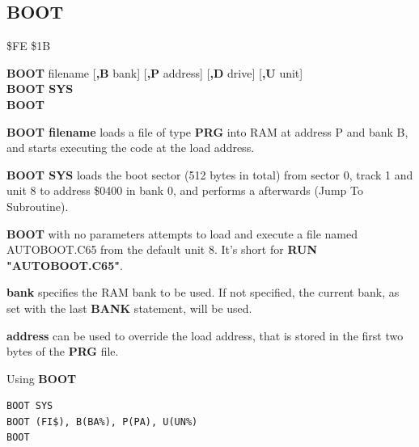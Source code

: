 
\newpage
\subsection{BOOT}
\begin{description}[leftmargin=2cm,style=nextline]
\item [Token:] \$FE \$1B
\item [Format:] {\bf BOOT} filename [{\bf,B} bank]
                [{\bf,P} address]  [{\bf,D} drive] [{\bf,U} unit]\\
                {\bf BOOT SYS} \\
                {\bf BOOT}
\item [Usage:]
   {\bf BOOT filename} loads a file of type
   {\bf PRG} into RAM at address P and bank B, and starts executing
   the code at the load address.

   {\bf BOOT SYS} loads the boot sector (512 bytes in total) from sector 0,
   track 1 and unit 8 to address \$0400 in bank 0, and
   performs a  afterwards (Jump To Subroutine).

   {\bf BOOT} with no parameters attempts to load
   and execute a file named AUTOBOOT.C65 from the default unit 8.
   It's short for {\bf RUN "AUTOBOOT.C65"}.

   \filenamedefinition

   {\bf bank} specifies the RAM bank to be used.
   If not specified, the current bank, as set with the last
   {\bf BANK} statement, will be used.

   {\bf address} can be used to override the load address,
   that is stored in the first two bytes of the {\bf PRG} file.

   \drivedefinition

   \unitdefinition

\item [Examples:] Using {\bf BOOT}
\begin{tcolorbox}[colback=black,coltext=white]
\verbatimfont{\codefont}
\begin{verbatim}
BOOT SYS
BOOT (FI$), B(BA%), P(PA), U(UN%)
BOOT
\end{verbatim}
\end{tcolorbox}
\end{description}

